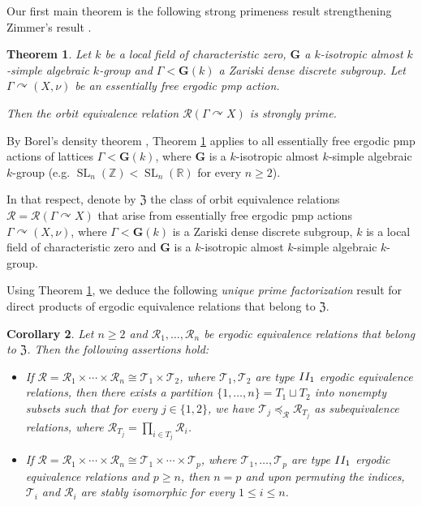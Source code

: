 \documentclass[11pt]{amsart}
\numberwithin{equation}{section}
\theoremstyle{plain}
\newtheorem{letterthm}{Theorem}
\newtheorem{lettercor}[letterthm]{Corollary}
\theoremstyle{definition}
\newcommand{\R}{\mathbb{R}}
\newcommand{\Z}{\mathbb{Z}}
\newcommand{\SL}{\operatorname{SL}}
\begin{document}
Our first main theorem is the following strong primeness result strengthening Zimmer's result \cite[Theorem 1.1]{Zi81}.



\begin{letterthm}\label{main-theorem}
Let $k$ be a local field of characteristic zero, $\mathbf G$ a $k$-isotropic almost $k$-simple algebraic $k$-group and $\Gamma < \mathbf G(k)$ a Zariski dense discrete subgroup. Let $\Gamma \curvearrowright (X, \nu)$ be an essentially free ergodic pmp action. 

Then the orbit equivalence relation $\mathscr R(\Gamma \curvearrowright X)$ is strongly prime.
\end{letterthm}

By Borel's density theorem \cite{Bo60}, Theorem \ref{main-theorem} applies to all essentially free ergodic pmp actions of lattices $\Gamma < \mathbf G(k)$, where $\mathbf G$ is a $k$-isotropic almost $k$-simple algebraic $k$-group (e.g.\! $\SL_n(\Z) < \SL_n(\R)$ for every $n \geq 2$). 

In that respect, denote by $\mathfrak Z$ the class of orbit equivalence relations $\mathscr R = \mathscr R(\Gamma \curvearrowright X)$ that arise from essentially free ergodic pmp actions $\Gamma \curvearrowright (X, \nu)$, where $\Gamma < \mathbf G(k)$ is a Zariski dense discrete subgroup, $k$ is a local field of characteristic zero and $\mathbf G$ is a $k$-isotropic almost $k$-simple algebraic $k$-group. 

Using Theorem \ref{main-theorem}, we deduce the following {\em unique prime factorization} result for direct products of ergodic equivalence relations that belong to $\mathfrak Z$.

\begin{lettercor}\label{main-cor}
Let $n \geq 2$ and $\mathscr R_1, \dots, \mathscr R_n$ be ergodic equivalence relations that belong to $\mathfrak Z$. Then the following assertions hold:

\begin{itemize}

\item [$(\rm i)$] If $\mathscr R = \mathscr R_1 \times \cdots \times \mathscr R_n \cong \mathscr T_1 \times \mathscr T_2$, where $\mathscr T_1, \mathscr T_2$ are type ${\rm II_1}$ ergodic equivalence relations, then there exists a partition $\{1, \dots, n\} = T_1 \sqcup T_2$ into nonempty subsets such that  for every $j \in \{1, 2\}$, we have $\mathscr T_j \preceq_{\mathscr R} \mathscr R_{T_j}$ as subequivalence relations, where $\mathscr R_{T_j} = \prod_{i \in T_j} \mathscr R_i$.

\item [$(\rm ii)$] If $\mathscr R = \mathscr R_1 \times \cdots \times \mathscr R_n \cong \mathscr T_1 \times \cdots \times \mathscr T_p$, where $\mathscr T_1, \dots, \mathscr T_p$ are type ${\rm II_1}$ ergodic equivalence relations and $p \geq n$, then $n = p$ and upon permuting the indices, $\mathscr T_i$ and $\mathscr R_i$ are stably isomorphic for every $1 \leq i \leq n$. 

\end{itemize}
\end{lettercor}
\end{document}
